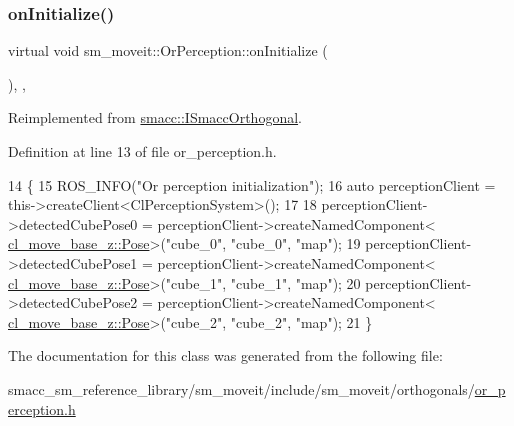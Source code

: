 \subsubsection{\texorpdfstring{on\+Initialize()}{onInitialize()}}
{\footnotesize\ttfamily virtual void sm\+\_\+moveit\+::\+Or\+Perception\+::on\+Initialize (\begin{DoxyParamCaption}{ }\end{DoxyParamCaption})\hspace{0.3cm}{\ttfamily [inline]}, {\ttfamily [override]}, {\ttfamily [virtual]}}



Reimplemented from \hyperlink{classsmacc_1_1ISmaccOrthogonal_a6bb31c620cb64dd7b8417f8705c79c7a}{smacc\+::\+I\+Smacc\+Orthogonal}.



Definition at line 13 of file or\+\_\+perception.\+h.


\begin{DoxyCode}
14     \{
15         ROS\_INFO(\textcolor{stringliteral}{"Or perception initialization"});
16         \textcolor{keyword}{auto} perceptionClient = this->createClient<ClPerceptionSystem>();
17 
18         perceptionClient->detectedCubePose0 = perceptionClient->createNamedComponent<
      \hyperlink{classcl__move__base__z_1_1Pose}{cl\_move\_base\_z::Pose}>(\textcolor{stringliteral}{"cube\_0"}, \textcolor{stringliteral}{"cube\_0"}, \textcolor{stringliteral}{"map"});
19         perceptionClient->detectedCubePose1 = perceptionClient->createNamedComponent<
      \hyperlink{classcl__move__base__z_1_1Pose}{cl\_move\_base\_z::Pose}>(\textcolor{stringliteral}{"cube\_1"}, \textcolor{stringliteral}{"cube\_1"}, \textcolor{stringliteral}{"map"});
20         perceptionClient->detectedCubePose2 = perceptionClient->createNamedComponent<
      \hyperlink{classcl__move__base__z_1_1Pose}{cl\_move\_base\_z::Pose}>(\textcolor{stringliteral}{"cube\_2"}, \textcolor{stringliteral}{"cube\_2"}, \textcolor{stringliteral}{"map"});
21     \}
\end{DoxyCode}


The documentation for this class was generated from the following file\+:\begin{DoxyCompactItemize}
\item 
smacc\+\_\+sm\+\_\+reference\+\_\+library/sm\+\_\+moveit/include/sm\+\_\+moveit/orthogonals/\hyperlink{sm__moveit_2include_2sm__moveit_2orthogonals_2or__perception_8h}{or\+\_\+perception.\+h}\end{DoxyCompactItemize}
